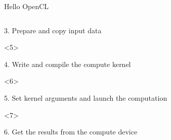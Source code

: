 \documentclass[@BEAMER_OPTIONS@]{beamer}
\begin{document}
\begin{frame}[fragile]{Hello OpenCL}
\begin{columns}
\begin{column}[c]{0.7\textwidth}
\begin{onlyenv}
\begin{exampleblock}{3. Prepare and copy input data}
\begin{adjustbox}{width=0.75\textwidth, height=\textheight, keepaspectratio}
\begin{minipage}{\textwidth}
                        \end{minipage}
                    \end{adjustbox}
                \end{exampleblock}
            \end{onlyenv}
            \begin{onlyenv}<5>
                \begin{exampleblock}{4. Write and compile the compute kernel}
                    \begin{adjustbox}{width=0.75\textwidth, height=\textheight, keepaspectratio}
                        \begin{minipage}{\textwidth}
                            
                        \end{minipage}
                    \end{adjustbox}
                \end{exampleblock}
            \end{onlyenv}
            \begin{onlyenv}<6>
                \begin{exampleblock}{5. Set kernel arguments and launch the computation}
                    \begin{adjustbox}{width=0.75\textwidth, height=\textheight, keepaspectratio}
                        \begin{minipage}{\textwidth}
                            
                        \end{minipage}
                    \end{adjustbox}
                \end{exampleblock}
            \end{onlyenv}
            \begin{onlyenv}<7>
                \begin{exampleblock}{6. Get the results from the compute device}
                    \begin{adjustbox}{width=0.75\textwidth, height=\textheight, keepaspectratio}
                        \begin{minipage}{\textwidth}
                            
                        \end{minipage}
                    \end{adjustbox}
                \end{exampleblock}
            \end{onlyenv}
        \end{column}
    \end{columns}
\end{frame}
\end{document}
